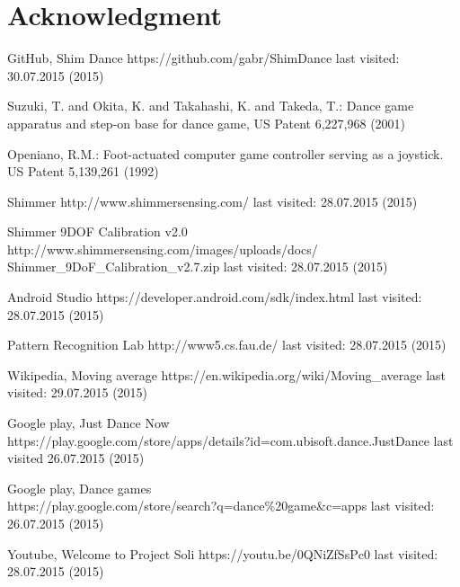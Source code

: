 \documentclass[conference]{IEEEtran}
\begin{document}


\section*{Acknowledgment}


\begin{thebibliography}{5}

GitHub, Shim Dance {https://github.com/gabr/ShimDance} last visited: 30.07.2015 (2015)

Suzuki, T. and Okita, K. and Takahashi, K. and Takeda, T.: {Dance game apparatus and step-on base for dance game}, US Patent 6,227,968 (2001)

Openiano, R.M.: {Foot-actuated computer game controller serving as a joystick}. US Patent 5,139,261 (1992)

Shimmer {http://www.shimmersensing.com/} last visited: 28.07.2015 (2015)

Shimmer 9DOF Calibration v2.0\\{http://www.shimmersensing.com/images/uploads/docs/\\Shimmer\_9DoF\_Calibration\_v2.7.zip} last visited: 28.07.2015 (2015)

Android Studio {https://developer.android.com/sdk/index.html} last visited: 28.07.2015 (2015)

Pattern Recognition Lab {http://www5.cs.fau.de/} last visited: 28.07.2015 (2015)

Wikipedia, Moving average {https://en.wikipedia.org/wiki/Moving\_average} last visited: 29.07.2015 (2015)

Google play, Just Dance Now\\{https://play.google.com/store/apps/details?id=com.ubisoft.dance.JustDance} last visited 26.07.2015 (2015)

Google play, Dance games\\{https://play.google.com/store/search?q=dance\%20game\&c=apps} last visited: 26.07.2015 (2015)

Youtube, Welcome to Project Soli {https://youtu.be/0QNiZfSsPc0} last visited: 28.07.2015 (2015)

\end{thebibliography}

\end{document}
